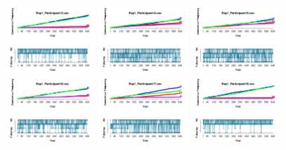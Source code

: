\begin{figure}[th]
\includegraphics[width=0.30\textwidth]{Figures/Outcome_Exp1_P13} \includegraphics[width=0.30\textwidth]{Figures/Outcome_Exp1_P14} \includegraphics[width=0.30\textwidth]{Figures/Outcome_Exp1_P15}
\includegraphics[width=0.30\textwidth]{Figures/Outcome_Exp1_P16} \includegraphics[width=0.30\textwidth]{Figures/Outcome_Exp1_P17} \includegraphics[width=0.30\textwidth]{Figures/Outcome_Exp1_P18}

\end{figure}
